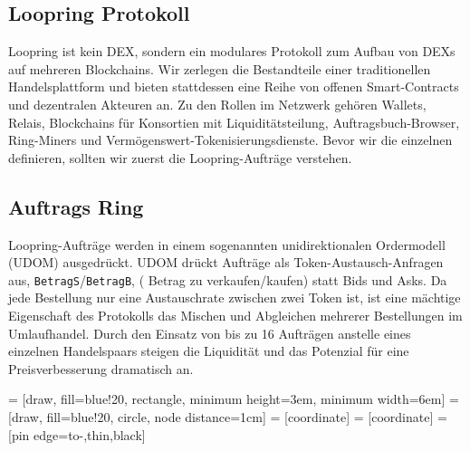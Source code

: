 \documentclass[UTF8,nofonts]{article}
\makeatletter
\newenvironment{figurehere}
 {\def\@captype{figure}}
 {}
\makeatother
\begin{document}
\begin{multicols}{2}
\section{Loopring Protokoll\label{sec:loopring_protocol}}
Loopring ist kein DEX, sondern ein modulares Protokoll zum Aufbau von DEXs auf mehreren Blockchains. Wir zerlegen die Bestandteile einer traditionellen Handelsplattform und bieten stattdessen eine Reihe von offenen Smart-Contracts und dezentralen Akteuren an. Zu den Rollen im Netzwerk gehören Wallets, Relais, Blockchains für Konsortien mit Liquiditätsteilung, Auftragsbuch-Browser, Ring-Miners und Vermögenswert-Tokenisierungsdienste. Bevor wir die einzelnen definieren, sollten wir zuerst die Loopring-Aufträge verstehen.

\subsection{Auftrags Ring\label{sec:order_ring}}
Loopring-Aufträge werden in einem sogenannten unidirektionalen Ordermodell (UDOM)\cite{coinport2014udom} ausgedrückt. UDOM drückt Aufträge als Token-Austausch-Anfragen aus, \verb|BetragS|/\verb|BetragB|, ( Betrag zu verkaufen/kaufen) statt Bids und Asks. Da jede Bestellung nur eine Austauschrate zwischen zwei Token ist, ist eine mächtige Eigenschaft des Protokolls das Mischen und Abgleichen mehrerer Bestellungen im Umlaufhandel. Durch den Einsatz von bis zu 16 Aufträgen anstelle eines einzelnen Handelspaars steigen die Liquidität und das Potenzial für eine Preisverbesserung dramatisch an.

\begin{center}
\begin{figurehere}
\centering
{} = [draw, fill=blue!20, rectangle, 
    minimum height=3em, minimum width=6em]
 = [draw, fill=blue!20, circle, node distance=1cm]
 = [coordinate]
 = [coordinate]
 = [pin edge={to-,thin,black}]

\end{figurehere}
\end{center}
\end{multicols}
\end{document}
